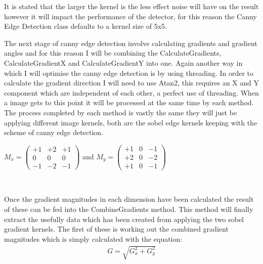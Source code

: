 \begin{FlushLeft}
\begin{enumerate}
    It is stated that the larger the kernel is the less effect noise will have on the result however it will impact the performance of the detector, for this reason the Canny Edge Detection class defaults to a kernel size of 5x5. \\ \bk

    The next stage of canny edge detection involve calculating gradients and gradient angles and for this reason I will be combining the CalculateGradients, CalculateGradientX and CalculateGradientY into one. Again another way in which I will optimise the canny edge detection is by using threading. In order to calculate the gradient direction I will need to use Atan2, this requires an X and Y component which are independent of each other, a perfect use of threading. When a image gets to this point it will be processed at the same time by each method. The process completed by each method is vastly the same they will just be applying different image kernels, both are the sobel edge kernels keeping with the scheme of canny edge detection. \\ \bk   

    \begin{center}
        
        $
        M_x = \begin{pmatrix}
            +1 & +2 & +1 \\
            0 & 0 & 0 \\
            -1 & -2 & -1
        \end{pmatrix}
    $ 
    and $ M_y = \begin{pmatrix}
            +1 & 0 & -1 \\
            +2 & 0 & -2 \\
            +1 & 0 & -1 
        \end{pmatrix}
    $
    \end{center} \\
 
    \bk

    Once the gradient magnitudes in each dimension have been calculated the result of these can be fed into the CombineGradients method. This method will finally extract the usefully data which has been created from applying the two sobel gradient kernels. The first of these is working out the combined gradient magnitudes which is simply calculated with the equation: \\
    
    \begin{gather*}
        G = \sqrt{G_x^2 + G_y^2}
    \end{gather*} \\
    

\end{enumerate}
\end{FlushLeft}
